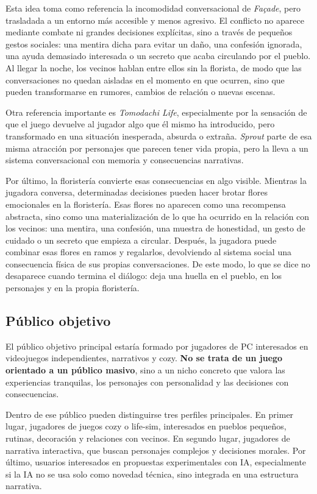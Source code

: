 \documentclass[12pt,twoside,titlepage]{report}
\begin{document}
Esta idea toma como referencia la incomodidad conversacional de \textit{Façade}, pero trasladada a un entorno más accesible y menos agresivo. El conflicto no aparece mediante combate ni grandes decisiones explícitas, sino a través de pequeños gestos sociales: una mentira dicha para evitar un daño, una confesión ignorada, una ayuda demasiado interesada o un secreto que acaba circulando por el pueblo. Al llegar la noche, los vecinos hablan entre ellos sin la florista, de modo que las conversaciones no quedan aisladas en el momento en que ocurren, sino que pueden transformarse en rumores, cambios de relación o nuevas escenas.

Otra referencia importante es \textit{Tomodachi Life}, especialmente por la sensación de que el juego devuelve al jugador algo que él mismo ha introducido, pero transformado en una situación inesperada, absurda o extraña. \textit{Sprout} parte de esa misma atracción por personajes que parecen tener vida propia, pero la lleva a un sistema conversacional con memoria y consecuencias narrativas.

Por último, la floristería convierte esas consecuencias en algo visible. Mientras la jugadora conversa, determinadas decisiones pueden hacer brotar flores emocionales en la floristería. Esas flores no aparecen como una recompensa abstracta, sino como una materialización de lo que ha ocurrido en la relación con los vecinos: una mentira, una confesión, una muestra de honestidad, un gesto de cuidado o un secreto que empieza a circular. Después, la jugadora puede combinar esas flores en ramos y regalarlos, devolviendo al sistema social una consecuencia física de sus propias conversaciones. De este modo, lo que se dice no desaparece cuando termina el diálogo: deja una huella en el pueblo, en los personajes y en la propia floristería.


\subsection{Público objetivo}

El público objetivo principal estaría formado por jugadores de PC interesados en videojuegos independientes, narrativos y cozy. \textbf{No se trata de un juego orientado a un público masivo}, sino a un nicho concreto que valora las experiencias tranquilas, los personajes con personalidad y las decisiones con consecuencias.

Dentro de ese público pueden distinguirse tres perfiles principales. En primer lugar, jugadores de juegos cozy o life-sim, interesados en pueblos pequeños, rutinas, decoración y relaciones con vecinos. En segundo lugar, jugadores de narrativa interactiva, que buscan personajes complejos y decisiones morales. Por último, usuarios interesados en propuestas experimentales con IA, especialmente si la IA no se usa solo como novedad técnica, sino integrada en una estructura narrativa.
\end{document}
